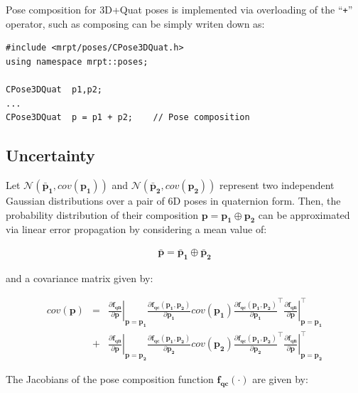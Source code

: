 \documentclass[a4paper,11pt]{report}
\begin{document}
Pose composition for 3D+Quat poses is implemented via overloading
of the ``\texttt{+}'' operator, such as composing can be simply
writen down as:

\begin{lstlisting}
#include <mrpt/poses/CPose3DQuat.h>
using namespace mrpt::poses;

CPose3DQuat  p1,p2;
...
CPose3DQuat  p = p1 + p2;    // Pose composition
\end{lstlisting}


\subsection{Uncertainty}

Let $\mathcal{N}(\mathbf{\bar{p}_1}, cov(\mathbf{p_1}))$ and
$\mathcal{N}(\mathbf{\bar{p}_2}, cov(\mathbf{p_2}))$ represent
two independent Gaussian distributions over a pair of 6D
poses in quaternion form.
Then, the probability distribution of their composition
$\mathbf{p} = \mathbf{p_1} \oplus \mathbf{p_2}$
can be approximated via linear error propagation by considering
a mean value of:

\begin{eqnarray}
\mathbf{\bar{p}} = \mathbf{\bar{p}_1} \oplus \mathbf{\bar{p}_2}
\end{eqnarray}

\noindent and a covariance matrix given by:

\begin{eqnarray}
cov(\mathbf{p}) &=&
\left. \frac{\partial \mathbf{f_{qn}} }{\partial \mathbf{p}} \right|_{\mathbf{p}=\mathbf{p_1}}
\frac{\partial \mathbf{f_{qc}}(\mathbf{p_1},\mathbf{p_2}) }{\partial \mathbf{p_1}}
cov(\mathbf{p_1})
\frac{\partial \mathbf{f_{qc}}(\mathbf{p_1},\mathbf{p_2}) }{\partial \mathbf{p_1}}^\top
\left. \frac{\partial \mathbf{f_{qn}} }{\partial \mathbf{p}} \right|_{\mathbf{p}=\mathbf{p_1}} ^\top
\nonumber \\ &+&
\left. \frac{\partial \mathbf{f_{qn}} }{\partial \mathbf{p}} \right|_{\mathbf{p}=\mathbf{p_2}}
\frac{\partial \mathbf{f_{qc}}(\mathbf{p_1},\mathbf{p_2}) }{\partial \mathbf{p_2}}
cov(\mathbf{p_2})
\frac{\partial \mathbf{f_{qc}}(\mathbf{p_1},\mathbf{p_2}) }{\partial \mathbf{p_2}}^\top
\left. \frac{\partial \mathbf{f_{qn}} }{\partial \mathbf{p}} \right|_{\mathbf{p}=\mathbf{p_2}}^\top
\end{eqnarray}

The Jacobians of the pose composition function $\mathbf{f_{qc}}(\cdot)$ are given by:
\end{document}
